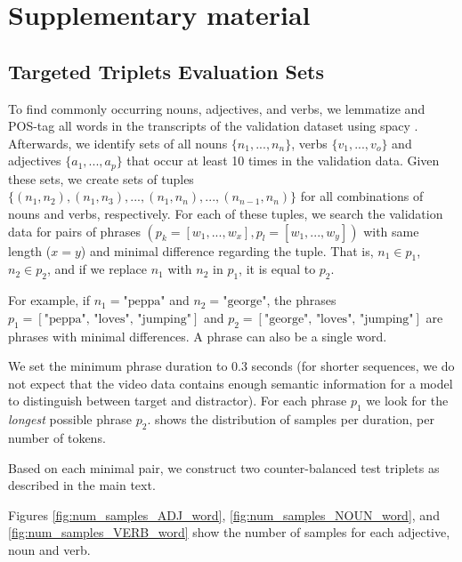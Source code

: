 \appendix

\section{Supplementary material}



\subsection{Targeted Triplets Evaluation Sets}\label{app:targeted_triplets_eval}

To find commonly occurring nouns, adjectives, and verbs, we lemmatize and POS-tag all words in the transcripts of the validation dataset using spacy \citep{honnibal2020spacy}. Afterwards, we identify sets of all nouns $\{n_1, ..., n_n\}$, verbs $\{v_1, ..., v_o\}$ and adjectives $\{a_1, ..., a_p\}$ that occur at least 10 times in the validation data. Given these sets, we create sets of tuples $\{(n_1, n_2), (n_1, n_3), ..., (n_1, n_n), ...,  (n_{n-1}, n_n)\}$ for all combinations of nouns and verbs, respectively. For each of these tuples, we search the validation data for pairs of phrases $(p_k=[w_1, ..., w_x], p_l=[w_1, ..., w_y])$ with same length ($x=y$) and minimal difference regarding the tuple. That is, $n_1 \in p_1$, $n_2 \in p_2$, and if we replace $n_1$ with $n_2$ in $p_1$, it is equal to $p_2$. 

For example, if $n_1 = \text{"peppa"}$ and $n_2 = \text{"george"}$, the phrases $p_1 = [\text{"peppa", "loves", "jumping"}]$ and $p_2 = [\text{"george", "loves", "jumping"}]$ are phrases with minimal differences. A phrase can also be a single word.

We set the minimum phrase duration to 0.3 seconds (for shorter sequences, we do not expect that the video data contains enough semantic information for a model to distinguish between target and distractor). For each phrase $p_1$ we look for the \textit{longest} possible phrase $p_2$.  shows the distribution of samples per duration,  per number of tokens.

Based on each minimal pair, we construct two counter-balanced test triplets as described in the main text.

Figures \ref{fig:num_samples_ADJ_word}, \ref{fig:num_samples_NOUN_word}, and \ref{fig:num_samples_VERB_word} show the number of samples for each adjective, noun and verb.


